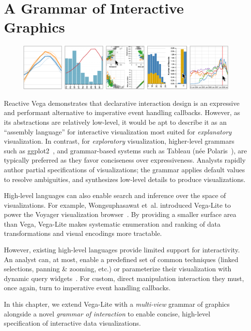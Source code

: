 \graphicspath{{./vega-lite/figures/}}
\chapter{A Grammar of Interactive Graphics}

\begin{figure}[h!]
  \vspace{-30pt}
  \centering
  \includegraphics[width=\columnwidth]{teaser}
\end{figure}


Reactive Vega demonstrates that declarative interaction design is an expressive
and performant alternative to imperative event handling callbacks. However, as
its abstractions are relatively low-level, it would be apt to describe it as an
``assembly language'' for interactive visualization most suited for
\emph{explanatory} visualization. In contrast, for \emph{exploratory}
visualization, higher-level grammars such as ggplot2~\cite{wickham:layered}, and
grammar-based systems such as Tableau (n\'ee Polaris~\cite{stolte:polaris}), are
typically preferred as they favor conciseness over expressiveness. Analysts
rapidly author partial specifications of visualizations; the grammar applies
default values to resolve ambiguities, and synthesizes low-level details to
produce visualizations.

High-level languages can also enable search and inference over the space of
visualizations. For example, Wongsuphasawat et~al. introduced Vega-Lite to power
the Voyager visualization browser~\cite{voyager}. By providing a smaller surface
area than Vega, Vega-Lite makes systematic enumeration and ranking of data
transformations and visual encodings more tractable.

However, existing high-level languages provide limited support for
interactivity. An analyst can, at most, enable a predefined set of common
techniques (linked selections, panning \& zooming, etc.) or parameterize their
visualization with dynamic query widgets~\cite{shiny}. For custom,
direct manipulation interaction they must, once again, turn to imperative event
handling callbacks.

In this chapter, we extend Vega-Lite with a \emph{multi-view} grammar of
graphics alongside a novel \emph{grammar of interaction} to enable concise,
high-level specification of interactive data visualizations.





